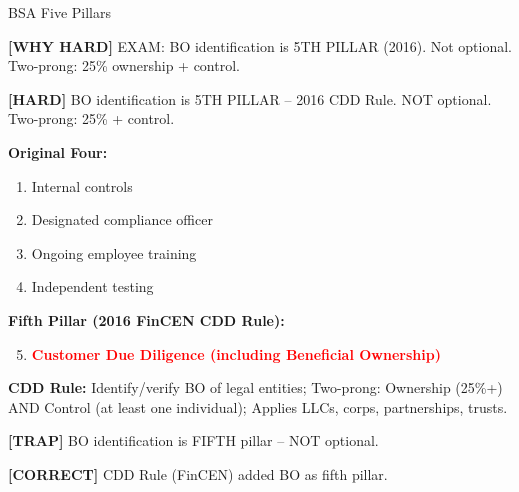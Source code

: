 \documentclass[6pt,aspectratio=169,fontsize=5pt]{beamer}
\renewcommand{\tiny}{\fontsize{3.5pt}{4.5pt}\selectfont}
\renewcommand{\normalsize}{\fontsize{7.5pt}{8.5pt}\selectfont}
\newcommand{\trap}[1]{%
	\begin{block}{\textcolor{redtrap}{\textbf{[TRAP]}}}
		\textcolor{redtrap}{\tiny #1}
	\end{block}
}
\newcommand{\correct}[1]{%
	\begin{block}{\textcolor{greencorrect}{\textbf{[CORRECT]}}}
		\textcolor{greencorrect}{\tiny #1}
	\end{block}
}
\newcommand{\hard}[1]{%
	\begin{block}{\textcolor{hardcolor}{\textbf{[HARD]}}}
		\textcolor{hardcolor}{\tiny #1}
	\end{block}
}
\newcommand{\hardexplain}[1]{%
	\begin{block}{\textcolor{orangehard}{\textbf{[WHY HARD]}}}
		\textcolor{orangehard}{\tiny #1}
	\end{block}
}
\begin{document}
	\begin{frame}{\normalsize BSA Five Pillars}
		
		\hardexplain{EXAM: BO identification is 5TH PILLAR (2016). Not optional. Two-prong: 25\% ownership + control.}
		
		\hard{BO identification is 5TH PILLAR -- 2016 CDD Rule. NOT optional. Two-prong: 25\% + control.}
		
		\textbf{Original Four:}
		\begin{enumerate}
			\item Internal controls
			\item Designated compliance officer
			\item Ongoing employee training
			\item Independent testing
		\end{enumerate}
		
		\textbf{Fifth Pillar (2016 FinCEN CDD Rule):}
		\begin{enumerate}
			\setcounter{enumi}{4}
			\item \textcolor{red}{\textbf{Customer Due Diligence (including Beneficial Ownership)}}
		\end{enumerate}
		
		\textbf{CDD Rule:} Identify/verify BO of legal entities; Two-prong: Ownership (25\%+) AND Control (at least one individual); Applies LLCs, corps, partnerships, trusts.
		
		\trap{BO identification is FIFTH pillar -- NOT optional.}
		
		\correct{2016 CDD Rule (FinCEN) added BO as fifth pillar.}
	\end{frame}
	
\end{document}
